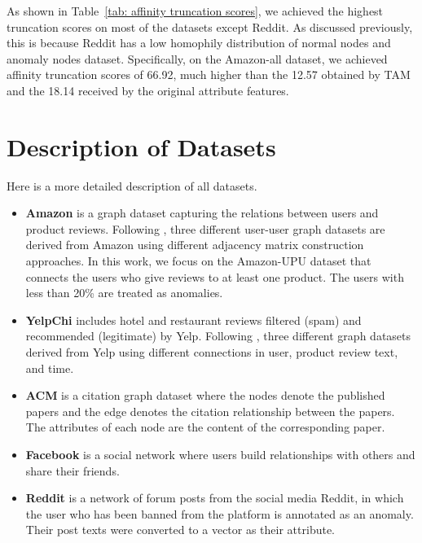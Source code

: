 \begin{appendix}
As shown in Table~\ref{tab: affinity truncation scores}, we achieved the highest truncation scores on most of the datasets except Reddit. As discussed previously, this is because Reddit has a low homophily distribution of normal nodes and anomaly nodes dataset.
Specifically, on the Amazon-all dataset, we achieved affinity truncation scores of 66.92, much higher than the 12.57 obtained by TAM and the 18.14 received by the original attribute features.




\section{Description of Datasets}
\label{app: datasets}
Here is a more detailed description of all datasets.
\begin{itemize}
    \item \textbf{Amazon} is a graph dataset capturing the relations between users and product reviews. Following \cite{dou2020enhancing,zhang2020gcn}, three different user-user graph datasets are derived from Amazon using different adjacency matrix construction approaches. 
    In this work, we focus on the Amazon-UPU dataset that connects the users who give reviews to at least one product. The users with less than 20\% are treated as anomalies. 

    \item \textbf{YelpChi} includes hotel and restaurant reviews filtered (spam) and recommended (legitimate) by Yelp. Following \cite{mukherjee2013yelp,rayana2015collective}, three different graph datasets derived from Yelp using different connections in user, product review text, and time.
    
    \item \textbf{ACM} is a citation graph dataset where the nodes denote the published papers and the edge denotes the citation relationship between the papers. The attributes of each node are the content of the corresponding paper.
    
    \item \textbf{Facebook} \cite{xu2022contrastive} is a social network where users build relationships with others and share their friends.

    \item \textbf{Reddit} is a network of forum posts from the social media Reddit, in which the user who has been banned from the platform is annotated as an anomaly. Their post texts were converted to a vector as their attribute.
    

\end{itemize}
\end{appendix}
